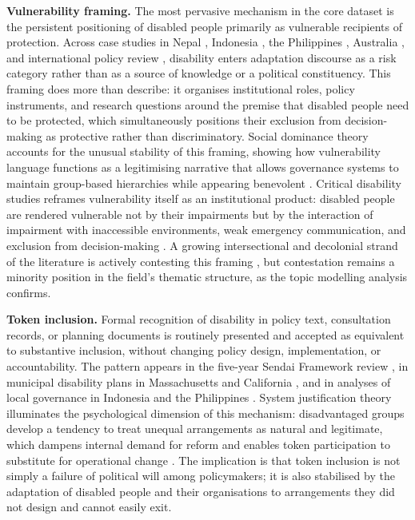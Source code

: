 \documentclass[12pt,a4paper]{article}
\begin{document}
\textbf{Vulnerability framing.} The most pervasive mechanism in the core dataset is the persistent positioning of disabled people primarily as vulnerable recipients of protection. Across case studies in Nepal \cite{devkota2023nepal}, Indonesia \cite{pertiwi2020indonesia}, the Philippines \cite{tagalo2020davao}, Australia \cite{quaill2019queensland}, and international policy review \cite{sheknoble2023communicating}, disability enters adaptation discourse as a risk category rather than as a source of knowledge or a political constituency. This framing does more than describe: it organises institutional roles, policy instruments, and research questions around the premise that disabled people need to be protected, which simultaneously positions their exclusion from decision-making as protective rather than discriminatory. Social dominance theory accounts for the unusual stability of this framing, showing how vulnerability language functions as a legitimising narrative that allows governance systems to maintain group-based hierarchies while appearing benevolent \cite{sidanius_pratto_1999_socdom,Murcott2025}. Critical disability studies reframes vulnerability itself as an institutional product: disabled people are rendered vulnerable not by their impairments but by the interaction of impairment with inaccessible environments, weak emergency communication, and exclusion from decision-making \cite{oliver_1990_politics,stjernholm2025critical}. A growing intersectional and decolonial strand of the literature is actively contesting this framing \cite{stjernholm2025critical,eriksen2025rock,pirmasari2023halinai}, but contestation remains a minority position in the field's thematic structure, as the topic modelling analysis confirms.

\textbf{Token inclusion.} Formal recognition of disability in policy text, consultation records, or planning documents is routinely presented and accepted as equivalent to substantive inclusion, without changing policy design, implementation, or accountability. The pattern appears in the five-year Sendai Framework review \cite{bennettgayle2020sendai}, in municipal disability plans in Massachusetts \cite{brown2025massachusetts} and California \cite{engelman2025california}, and in analyses of local governance in Indonesia \cite{setijaningrum2024tokenism} and the Philippines \cite{tagalo2020davao}. System justification theory illuminates the psychological dimension of this mechanism: disadvantaged groups develop a tendency to treat unequal arrangements as natural and legitimate, which dampens internal demand for reform and enables token participation to substitute for operational change \cite{jost_2003_decade,Akike2025}. The implication is that token inclusion is not simply a failure of political will among policymakers; it is also stabilised by the adaptation of disabled people and their organisations to arrangements they did not design and cannot easily exit.
\end{document}
